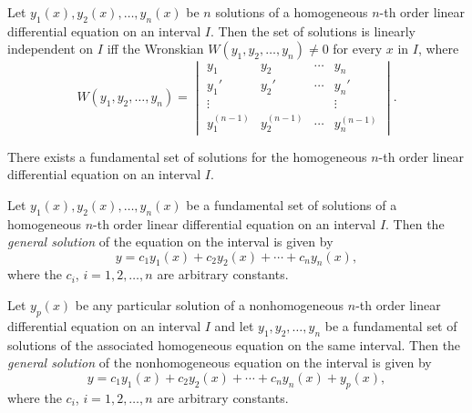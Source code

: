 \documentclass{article}
\begin{document}
\begin{thm} 
    Let \(y_1(x), y_2(x), \ldots, y_n(x)\) be \(n\) solutions of a homogeneous \(n\)-th order linear differential equation on an interval \(I\). Then the set of solutions is linearly independent on \(I\) iff the Wronskian \(W(y_1, y_2, \ldots, y_n) \neq 0\) for every \(x\) in \(I\), where
    \begin{equation}
        W(y_1, y_2, \ldots, y_n) = \begin{vmatrix}
            y_1 & y_2 & \cdots & y_n\\
            y_1' & y_2' & \cdots & y_n'\\
            \vdots & & & \vdots\\
            y_1^{(n-1)} & y_2^{(n-1)} & \cdots & y_n^{(n-1)}
        \end{vmatrix}.
    \end{equation}
\end{thm}

\begin{thm} 
    There exists a fundamental set of solutions for the homogeneous \(n\)-th order linear differential equation on an interval \(I\).
\end{thm}

\begin{thm} 
    Let \(y_1(x), y_2(x), \ldots, y_n(x)\) be a fundamental set of solutions of a homogeneous \(n\)-th order linear differential equation on an interval \(I\). Then the \emph{general solution} of the equation on the interval is given by
    \begin{equation}
        y = c_1y_1(x) + c_2y_2(x) + \cdots + c_ny_n(x),
    \end{equation}
    where the \(c_i\), \(i = 1, 2, \ldots, n\) are arbitrary constants.
\end{thm}

\begin{thm} 
    Let \(y_p(x)\) be any particular solution of a nonhomogeneous \(n\)-th order linear differential equation on an interval \(I\) and let \(y_1, y_2, \ldots, y_n\) be a fundamental set of solutions of the associated homogeneous equation on the same interval. Then the \emph{general solution} of the nonhomogeneous equation on the interval is given by
    \begin{equation}
        y = c_1y_1(x) + c_2y_2(x) + \cdots + c_ny_n(x) + y_p(x),
    \end{equation}
    where the \(c_i\), \(i = 1, 2, \ldots, n\) are arbitrary constants.
\end{thm}
\end{document}
